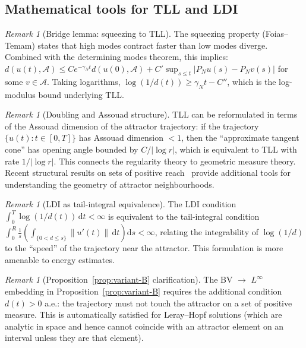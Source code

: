 \documentclass[12pt,a4paper]{article}
\theoremstyle{definition}
\theoremstyle{plain}
\theoremstyle{remark}
\newtheorem{remark}[definition]{Remark}
\begin{document}
\subsection{Mathematical tools for TLL and LDI}

\begin{remark}[Bridge lemma: squeezing to TLL]
\label{rem:bridge-squeezing}
The squeezing property (Foias--Temam) states that high modes contract faster than low modes diverge. Combined with the determining modes theorem, this implies: $d(u(t), \mathcal{A}) \leq C e^{-\gamma_N t} d(u(0), \mathcal{A}) + C' \sup_{s \leq t} |P_N u(s) - P_N v(s)|$ for some $v \in \mathcal{A}$. Taking logarithms, $\log(1/d(t)) \geq \gamma_N t - C''$, which is the log-modulus bound underlying TLL.
\end{remark}

\begin{remark}[Doubling and Assouad structure]
\label{rem:doubling-assouad}
TLL can be reformulated in terms of the Assouad dimension of the attractor trajectory: if the trajectory $\{u(t) : t \in [0,T]\}$ has Assouad dimension $< 1$, then the ``approximate tangent cone'' has opening angle bounded by $C/|\log r|$, which is equivalent to TLL with rate $1/|\log r|$. This connects the regularity theory to geometric measure theory. Recent structural results on sets of positive reach~\cite{Lytchak2024} provide additional tools for understanding the geometry of attractor neighbourhoods.
\end{remark}

\begin{remark}[LDI as tail-integral equivalence]
\label{rem:ldi-tail}
The LDI condition $\int_0^T \log(1/d(t))\,\mathrm{d}t < \infty$ is equivalent to the tail-integral condition $\int_0^R \frac{1}{s} \left( \int_{\{0 < d \leq s\}} \|u'(t)\|\,\mathrm{d}t \right) \mathrm{d}s < \infty$, relating the integrability of $\log(1/d)$ to the ``speed'' of the trajectory near the attractor. This formulation is more amenable to energy estimates.
\end{remark}

\begin{remark}[Proposition~\ref{prop:variant-B} clarification]
\label{rem:prop-variant-B-clarification}
The BV $\to$ $L^\infty$ embedding in Proposition~\ref{prop:variant-B} requires the additional condition $d(t) > 0$ a.e.: the trajectory must not touch the attractor on a set of positive measure. This is automatically satisfied for Leray--Hopf solutions (which are analytic in space and hence cannot coincide with an attractor element on an interval unless they are that element).
\end{remark}
\end{document}
